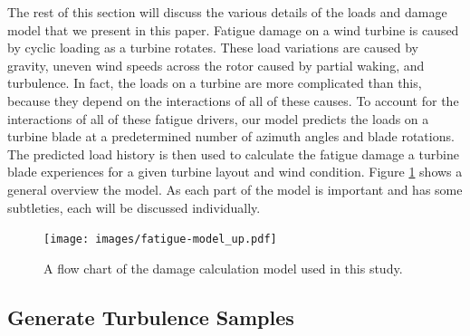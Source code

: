 \documentclass[11pt,letterpaper]{article}
\begin{document}
The rest of this section will discuss the various details of the loads and damage model that we present in this paper. 
Fatigue damage on a wind turbine is caused by cyclic loading as a turbine rotates. These load variations are caused by gravity, uneven wind speeds across the rotor caused by partial waking, and turbulence. In fact, the loads on a turbine are more complicated than this, because they depend on the interactions of all of these causes.
To account for the interactions of all of these fatigue drivers, our model predicts the loads on a turbine blade at a predetermined number of azimuth angles and blade rotations. The predicted load history is then used to calculate the fatigue damage a turbine blade experiences for a given turbine layout and wind condition.
Figure \ref{flow-chart} shows a general overview the model. As each part of the model is important and has some subtleties, each will be discussed individually.
% 
\begin{figure}
    \centering
    \texttt{[image: images/fatigue-model\_up.pdf]}
    \caption{A flow chart of the damage calculation model used in this study.}
    \label{flow-chart}
\end{figure}

\subsection{Generate Turbulence Samples}

\end{document}
